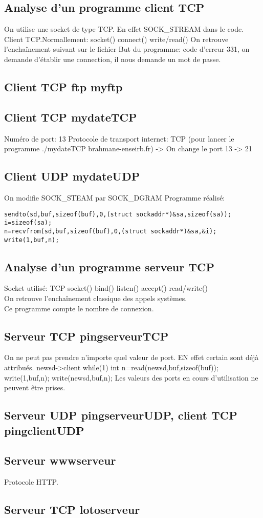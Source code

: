 \documentclass[paper=a4, fontsize=12pt]{article}
\numberwithin{equation}{section}		%
\numberwithin{figure}{section}			%
\numberwithin{table}{section}				%
\begin{document}
\subsection{Analyse d'un programme client TCP}
On utilise une socket de type TCP. En effet SOCK\_STREAM dans le code. 
Client TCP.Normallement:
socket()
connect()
write/read()
On retrouve l'enchaînement suivant sur le fichier
But du programme: code d'erreur 331, on demande d'établir une connection, il nous demande un mot de passe.
\subsection{Client TCP ftp myftp}
\subsection{Client TCP mydateTCP}
Numéro de port: 13 Protocole de transport internet: TCP
(pour lancer le programme ./mydateTCP brahmane-enseirb.fr)
-> On change le port 13 -> 21
\subsection{Client UDP mydateUDP}
On modifie SOCK\_STEAM par SOCK\_DGRAM
Programme réalisé:
\begin{verbatim}
sendto(sd,buf,sizeof(buf),0,(struct sockaddr*)&sa,sizeof(sa));
i=sizeof(sa);
n=recvfrom(sd,buf,sizeof(buf),0,(struct sockaddr*)&sa,&i);
write(1,buf,n);
\end{verbatim}
\subsection{Analyse d'un programme serveur TCP}
Socket utilisé: TCP
socket()
bind()
listen()
accept()
read/write()
\\On retrouve l'enchaînement classique des appels systèmes.
\\Ce programme compte le nombre de connexion.
\subsection{Serveur TCP pingserveurTCP}
On ne peut pas prendre n'importe quel valeur de port. EN effet certain sont déjà attribués.
newsd->client
while(1){
int n=read(newsd,buf,sizeof(buf));
write(1,buf,n);
write(newsd,buf,n);
}
Les valeurs des ports en cours d'utilisation ne peuvent être prises.
\subsection{Serveur UDP pingserveurUDP, client TCP pingclientUDP}
\subsection{Serveur wwwserveur}
Protocole HTTP.
\subsection{Serveur TCP lotoserveur}

\end{document}
